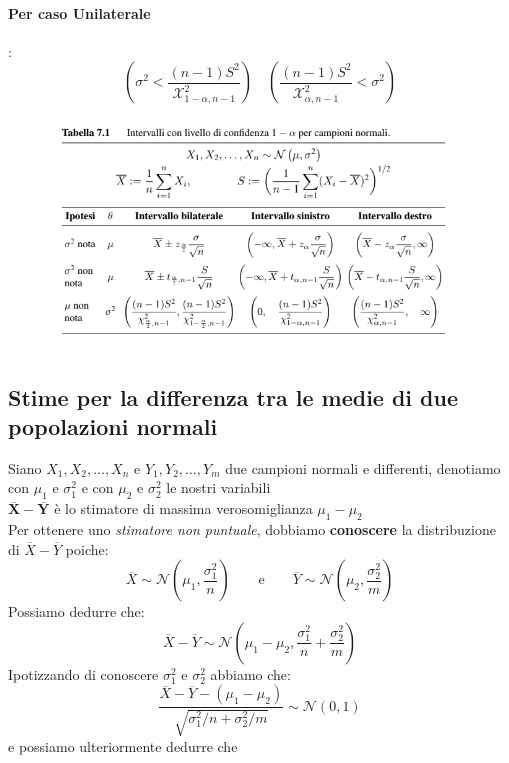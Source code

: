 \documentclass[]{article}
\begin{document}
    \paragraph{Per caso Unilaterale}:
    \begin{equation}
        \left( \sigma^2  < \frac{(n-1)S^2}{\mathcal{X}^2_{1-\alpha, n-1}}\right) \quad \left( \frac{(n-1)S^2}{\mathcal{X}^2_{\alpha, n-1}} < \sigma^2 \right)
    \end{equation}
    \begin{figure}[H]
        \includegraphics[width=\textwidth]{images/boh_2.png}
    \end{figure}
    \subsection{Stime per la differenza tra le medie di due popolazioni normali}
    Siano $X_1, X_2, \ldots, X_n$ e $Y_1, Y_2, \ldots, Y_m$ due campioni normali e differenti, denotiamo con $\mu_1$ e $\sigma^2_1$ e con $\mu_2$ e $\sigma^2_2$ le nostri variabili\\
    $\boldsymbol{\overline{X} - \overline{Y}}$ è lo stimatore di massima verosomiglianza $\mu_1 - \mu_2$ \\
    Per ottenere uno \textit{stimatore non puntuale}, dobbiamo \textbf{conoscere} la distribuzione di $\overline{X} - \overline{Y}$ poiche:
    \[ \overline{X} \sim \mathcal{N} \left( \mu_1, \frac{\sigma^2_1}{n} \right)  \qquad \text{e} \qquad \overline{Y} \sim \mathcal{N}\left( \mu_2, \frac{\sigma^2_2}{m} \right) \]
    Possiamo dedurre che:
    \[ \overline{X} - \overline{Y} \sim \mathcal{N}\left( \mu_1 - \mu_2, \frac{\sigma^2_1}{n} + \frac{\sigma^2_2}{m} \right) \]
    Ipotizzando di conoscere $\sigma^2_1$ e $\sigma^2_2$ abbiamo che:
    \[ \frac{\overline{X} - \overline{Y} - (\mu_1 - \mu_2)}{\sqrt{\sigma^2_1 / n + \sigma^2_2 / m}} \sim \mathcal{N}(0,1) \]
    e possiamo ulteriormente dedurre che
\end{document}
